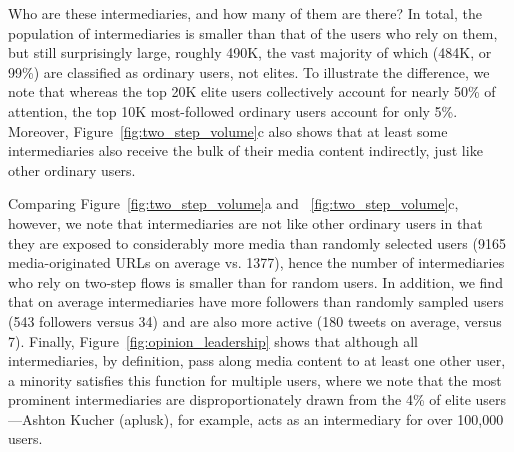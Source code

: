 \documentclass[phd,tocprelim]{cornell}
\begin{document}


Who are these intermediaries, and how many of them are there? In total, the
population of intermediaries is smaller than that of the users who rely on
them, but still surprisingly large, roughly 490K, the vast majority of
which (484K, or 99\%) are classified as ordinary users, not elites. To
illustrate the difference, we note that whereas the top 20K elite users
collectively account for nearly 50\% of attention, the top 10K
most-followed ordinary users account for only 5\%.
Moreover, Figure~\ref{fig:two_step_volume}c also shows that at least some
intermediaries also receive the bulk of their media content indirectly,
just like other ordinary users.

Comparing Figure~\ref{fig:two_step_volume}a and
~\ref{fig:two_step_volume}c, however, we note that intermediaries are not
like other ordinary users in that they are exposed to considerably more
media than randomly selected users (9165 media-originated URLs on average
vs. 1377),
hence the number of intermediaries who rely on two-step flows is smaller
than for random users. In addition, we find that on average intermediaries
have more followers than randomly sampled users (543 followers versus 34)
and are also more active (180 tweets on average, versus 7). Finally,
Figure~\ref{fig:opinion_leadership} shows that although all intermediaries,
by definition, pass along media content to at least one other user, a
minority satisfies this function for multiple users, where we note that the
most prominent intermediaries are disproportionately drawn from the 4\% of
elite users---Ashton Kucher (aplusk), for example, acts as an intermediary
for over 100,000 users.
\end{document}
